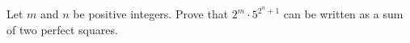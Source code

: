 Let $m$ and $n$ be positive integers. Prove that $2^m\cdot5^{2^n+1}$ can be written as a sum of two perfect squares.
